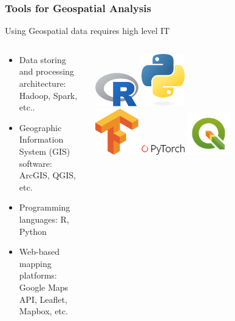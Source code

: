 \documentclass[xcolor=x11names,compress]{beamer}
\renewcommand{\(}{\begin{columns}}
\renewcommand{\)}{\end{columns}}
\newcommand{\<}[1]{\begin{column}{#1}}
\renewcommand{\>}{\end{column}}
\begin{document}
\begin{frame}
    \frametitle{Tools for Geospatial Analysis}
Using Geospatial data requires high level IT
    \begin{columns}[T]
        \begin{column}{0.5\textwidth}
            \begin{itemize}[<+->]
                \item Data storing and processing architecture: Hadoop, Spark, etc..
                \item Geographic Information System (GIS) software: ArcGIS, QGIS, etc.
                \item Programming languages: R, Python
                \item Web-based mapping platforms: Google Maps API, Leaflet, Mapbox, etc.
            \end{itemize}
        \end{column}
        \begin{column}{0.5\textwidth}
        \vspace{1cm}
            \includegraphics[width=0.2\textwidth]{R_logo.svg.png}  \includegraphics[width=0.2\textwidth]{python-logo.png} \\ \includegraphics[width=0.2\textwidth]{Tensorflow_logo.svg.png}  \includegraphics[width=0.2\textwidth]{Pytorch.png}
            \includegraphics[width=0.2\textwidth]{QGIS.jpg}
        \end{column}
    \end{columns}
\end{frame}
\end{document}

